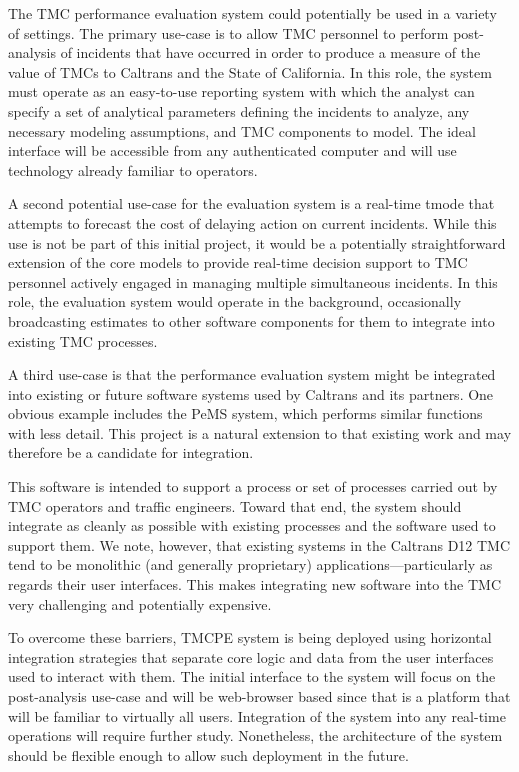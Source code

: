 \documentclass[12pt]{report}
\newcounter{time}
\begin{document}
The \ac{TMC} performance evaluation system could potentially be used in a
variety of settings. The primary use-case is to allow \ac{TMC} personnel to
perform post-analysis of incidents that have occurred in order to
produce a measure of the value of \acp{TMC} to Caltrans and the State of
California. In this role, the system must operate as an easy-to-use
reporting system with which the analyst can specify a set of
analytical parameters defining the incidents to analyze, any necessary
modeling assumptions, and \ac{TMC} components to model. The ideal interface
will be accessible from any authenticated computer and will use
technology already familiar to operators.

A second potential use-case for the evaluation system is a real-time
tmode that attempts to forecast the cost of delaying action on current
incidents. While this use is not be part of this initial project, it
would be a potentially straightforward extension of the core models to
provide real-time decision support to \ac{TMC} personnel actively
engaged in managing multiple simultaneous incidents. In this role, the
evaluation system would operate in the background, occasionally
broadcasting estimates to other software components for them to
integrate into existing \ac{TMC} processes.

A third use-case is that the performance evaluation system might be
integrated into existing or future software systems used by Caltrans
and its partners. One obvious example includes the \ac{PeMS} system, which
performs similar functions with less detail. This project is a natural
extension to that existing work and may therefore be a candidate for
integration.

This software is intended to support a process or set of processes
carried out by \ac{TMC} operators and traffic engineers.  Toward that end,
the system should integrate as cleanly as possible with existing
processes and the software used to support them.  We note, however,
that existing systems in the Caltrans \ac{D12} \ac{TMC} tend to be monolithic
(and generally proprietary) applications---particularly as regards
their user interfaces.  This makes integrating new software into the
\ac{TMC} very challenging and potentially expensive.

To overcome these barriers, \ac{TMCPE} system is being deployed using
horizontal integration strategies that separate core logic and data
from the user interfaces used to interact with them.  The initial
interface to the system will focus on the post-analysis use-case and
will be web-browser based since that is a platform that will be
familiar to virtually all users.  Integration of the system into any
real-time operations will require further study.  Nonetheless, the
architecture of the system should be flexible enough to allow such
deployment in the future.
\end{document}

